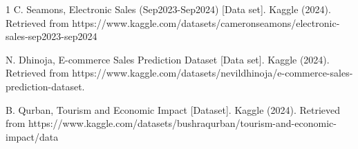 \documentclass[a4paper,fleqn]{cas-dc}
\begin{document}
\begin{thebibliography}{1}
C. Seamons, Electronic Sales (Sep2023-Sep2024) [Data set]. Kaggle (2024). Retrieved from https://www.kaggle.com/datasets/cameronseamons/electronic-sales-sep2023-sep2024

N. Dhinoja, E-commerce Sales Prediction Dataset [Data set]. Kaggle (2024). Retrieved from https://www.kaggle.com/datasets/nevildhinoja/e-commerce-sales-prediction-dataset.

B. Qurban, Tourism and Economic Impact [Dataset]. Kaggle (2024). Retrieved from https://www.kaggle.com/datasets/bushraqurban/tourism-and-economic-impact/data

\end{thebibliography}



\end{document}
